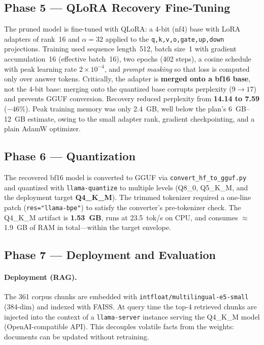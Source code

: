 \documentclass[11pt,a4paper]{article}
\begin{document}
\subsection{Phase 5 --- QLoRA Recovery Fine-Tuning}
The pruned model is fine-tuned with QLoRA: a 4-bit (nf4) base with LoRA
adapters of rank~16 and $\alpha=32$ applied to the
\texttt{q,k,v,o,gate,up,down} projections. Training used sequence length~512,
batch size~1 with gradient accumulation~16 (effective batch~16), two epochs
(402 steps), a cosine schedule with peak learning rate $2\times10^{-4}$, and
\emph{prompt masking} so that loss is computed only over answer tokens.
Critically, the adapter is \textbf{merged onto a bf16 base}, not the 4-bit
base: merging onto the quantized base corrupts perplexity ($9{\to}17$) and
prevents GGUF conversion. Recovery reduced perplexity from \textbf{14.14 to
7.59} ($-46\%$). Peak training memory was only \SI{2.4}{GB}, well below the
plan's \SIrange{6}{12}{GB} estimate, owing to the small adapter rank,
gradient checkpointing, and a plain AdamW optimizer.

\subsection{Phase 6 --- Quantization}
The recovered bf16 model is converted to GGUF via
\texttt{convert\_hf\_to\_gguf.py} and quantized with \texttt{llama-quantize}
to multiple levels (Q8\_0, Q5\_K\_M, and the deployment target
\textbf{Q4\_K\_M}). The trimmed tokenizer required a one-line patch
(\texttt{res="llama-bpe"}) to satisfy the converter's pre-tokenizer check.
The Q4\_K\_M artifact is \textbf{1.53~GB}, runs at \SI{23.5}{tok/s} on CPU,
and consumes $\approx$\SI{1.9}{GB} of RAM in total---within the target
envelope.

\subsection{Phase 7 --- Deployment and Evaluation}
\paragraph{Deployment (RAG).} The 361 corpus chunks are embedded with
\texttt{intfloat/multilingual-e5-small} (384-dim) and indexed with FAISS. At
query time the top-4 retrieved chunks are injected into the context of a
\texttt{llama-server} instance serving the Q4\_K\_M model
(OpenAI-compatible API). This decouples volatile facts from the weights:
documents can be updated without retraining.
\end{document}
